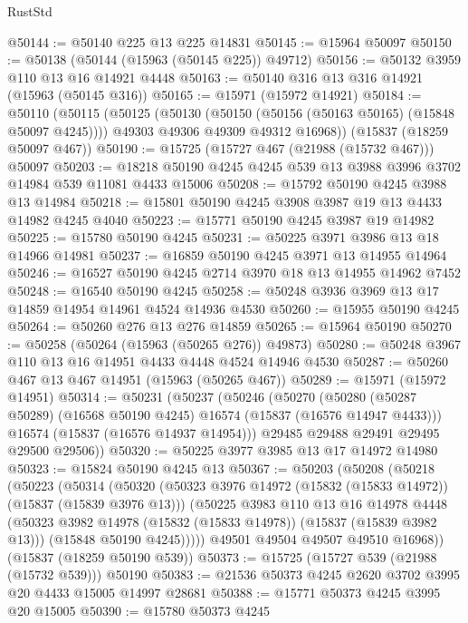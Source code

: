 \begin{lexlean}{RustStd}
\begin{coremodule}
{\begin{coremodule}
{{{{{{{{{{{{{{{{{{{{{{{{{{{{{{{{{{{{{{{{{{{{{{{{{{{{{{{{{{{{@50144 := @50140 @225 @13 @225 @14831
@50145 := @15964 @50097
@50150 := @50138 (@50144 (@15963 (@50145 @225)) @49712)
@50156 := @50132 @3959 @110 @13 @16 @14921 @4448
@50163 := @50140 @316 @13 @316 @14921 (@15963 (@50145 @316))
@50165 := @15971 (@15972 @14921)
@50184 := @50110
    (@50115
      (@50125
        (@50130 (@50150 (@50156 (@50163 @50165) (@15848 @50097 @4245))))
        @49303
        @49306
        @49309
        @49312
        @16968))
    (@15837 (@18259 @50097 @467))
@50190 := @15725 (@15727 @467 (@21988 (@15732 @467))) @50097
@50203 := @18218 @50190 @4245 @4245 @539 @13 @3988 @3996 @3702 @14984 @539 @11081 @4433 @15006
@50208 := @15792 @50190 @4245 @3988 @13 @14984
@50218 := @15801 @50190 @4245 @3908 @3987 @19 @13 @4433 @14982 @4245 @4040
@50223 := @15771 @50190 @4245 @3987 @19 @14982
@50225 := @15780 @50190 @4245
@50231 := @50225 @3971 @3986 @13 @18 @14966 @14981
@50237 := @16859 @50190 @4245 @3971 @13 @14955 @14964
@50246 := @16527 @50190 @4245 @2714 @3970 @18 @13 @14955 @14962 @7452
@50248 := @16540 @50190 @4245
@50258 := @50248 @3936 @3969 @13 @17 @14859 @14954 @14961 @4524 @14936 @4530
@50260 := @15955 @50190 @4245
@50264 := @50260 @276 @13 @276 @14859
@50265 := @15964 @50190
@50270 := @50258 (@50264 (@15963 (@50265 @276)) @49873)
@50280 := @50248 @3967 @110 @13 @16 @14951 @4433 @4448 @4524 @14946 @4530
@50287 := @50260 @467 @13 @467 @14951 (@15963 (@50265 @467))
@50289 := @15971 (@15972 @14951)
@50314 := @50231
    (@50237
      (@50246
        (@50270
          (@50280 (@50287 @50289) (@16568 @50190 @4245) @16574 (@15837 (@16576 @14947 @4433)))
          @16574
          (@15837 (@16576 @14937 @14954)))
        @29485
        @29488
        @29491
        @29495
        @29500
        @29506))
@50320 := @50225 @3977 @3985 @13 @17 @14972 @14980
@50323 := @15824 @50190 @4245 @13
@50367 := @50203
    (@50208
      (@50218
        (@50223
          (@50314
            (@50320
              (@50323 @3976 @14972 (@15832 (@15833 @14972)) (@15837 (@15839 @3976 @13)))
              (@50225
                @3983
                @110
                @13
                @16
                @14978
                @4448
                (@50323 @3982 @14978 (@15832 (@15833 @14978)) (@15837 (@15839 @3982 @13)))
                (@15848 @50190 @4245)))))
        @49501
        @49504
        @49507
        @49510
        @16968))
    (@15837 (@18259 @50190 @539))
@50373 := @15725 (@15727 @539 (@21988 (@15732 @539))) @50190
@50383 := @21536 @50373 @4245 @2620 @3702 @3995 @20 @4433 @15005 @14997 @28681
@50388 := @15771 @50373 @4245 @3995 @20 @15005
@50390 := @15780 @50373 @4245
}}}}}}}}}}}}}}}}}}}}}}}}}}}}}}}}}}}}}}}}}}}}}}}}}}}}}}}}}}}}
\end{coremodule}}
\end{coremodule}
\end{lexlean}
